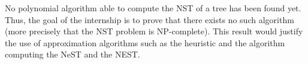 No polynomial algorithm able to compute the NST of a tree has been
found yet. Thus, the goal of the internship is to prove that there
exists no such algorithm (more precisely that the NST problem is
NP-complete). This result would justify the use of approximation
algorithms such as the heuristic and the algorithm computing the NeST
and the NEST.
